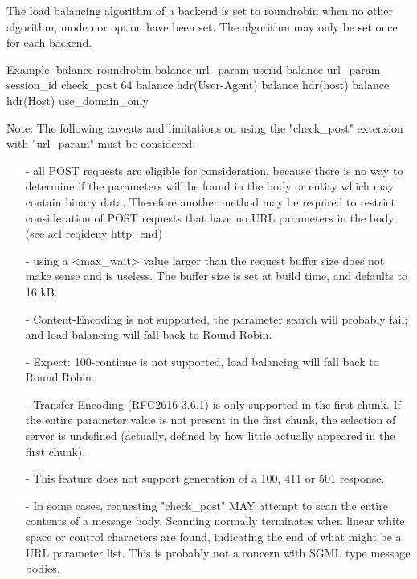   The load balancing algorithm of a backend is set to roundrobin when no other
  algorithm, mode nor option have been set. The algorithm may only be set once
  for each backend.

  \begin{example}{Example:}
        balance roundrobin
        balance url_param userid
        balance url_param session_id check_post 64
        balance hdr(User-Agent)
        balance hdr(host)
        balance hdr(Host) use_domain_only
  \end{example}

  \begin{note}{Note:}
  The following caveats and limitations on using the "check\_post"
  extension with "url\_param" must be considered:
  
  \begin{itemize}
  \item[-] all POST requests are eligible for consideration, because there is no way
      to determine if the parameters will be found in the body or entity which
      may contain binary data. Therefore another method may be required to
      restrict consideration of POST requests that have no URL parameters in
      the body. (see acl reqideny http\_end)

  \item[-] using a <max\_wait> value larger than the request buffer size does not
      make sense and is useless. The buffer size is set at build time, and
      defaults to 16 kB.

  \item[-] Content-Encoding is not supported, the parameter search will probably
      fail; and load balancing will fall back to Round Robin.

  \item[-] Expect: 100-continue is not supported, load balancing will fall back to
      Round Robin.

  \item[-] Transfer-Encoding (RFC2616 3.6.1) is only supported in the first chunk.
      If the entire parameter value is not present in the first chunk, the
      selection of server is undefined (actually, defined by how little
      actually appeared in the first chunk).

  \item[-] This feature does not support generation of a 100, 411 or 501 response.

  \item[-] In some cases, requesting "check\_post" MAY attempt to scan the entire
      contents of a message body. Scanning normally terminates when linear
      white space or control characters are found, indicating the end of what
      might be a URL parameter list. This is probably not a concern with SGML
      type message bodies.
  \end{itemize}
  \end{note}

